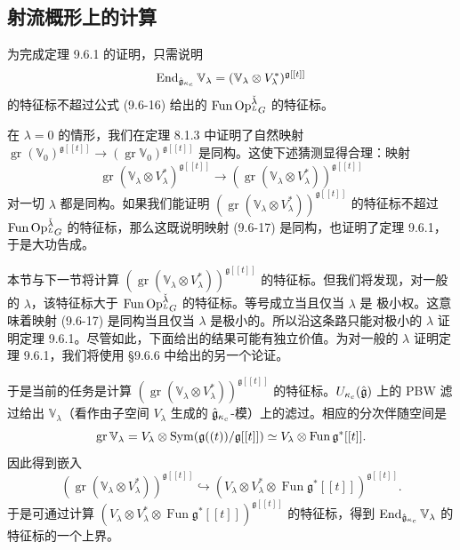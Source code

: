 \subsection{射流概形上的计算}

为完成定理 9.6.1 的证明，只需说明
\[
    \operatorname{End}_{\hat{\mathfrak{g}}_{\kappa_c}}\mathbb{V}_\lambda
    =(\mathbb{V}_\lambda\otimes V_\lambda^*)^{\mathfrak{g}[[t]]}
\]
的特征标不超过公式 (9.6-16) 给出的 $\operatorname{Fun}\operatorname{Op}^{\check\lambda}_{{}^LG}$ 的特征标。

在 $\lambda=0$ 的情形，我们在定理 8.1.3 中证明了自然映射
$\operatorname{gr}(\mathbb{V}_0)^{\mathfrak{g}[[t]]}\to(\operatorname{gr}\mathbb{V}_0)^{\mathfrak{g}[[t]]}$ 是同构。这使下述猜测显得合理：映射
\begin{equation}
    \operatorname{gr}(\mathbb{V}_\lambda\otimes V_\lambda^*)^{\mathfrak{g}[[t]]}
    \to\left(\operatorname{gr}(\mathbb{V}_\lambda\otimes V_\lambda^*)\right)^{\mathfrak{g}[[t]]}
    \tag{9.6-17}
\end{equation}
对一切 $\lambda$ 都是同构。如果我们能证明 $\left(\operatorname{gr}(\mathbb{V}_\lambda\otimes V_\lambda^*)\right)^{\mathfrak{g}[[t]]}$ 的特征标不超过 $\operatorname{Fun}\operatorname{Op}^{\check\lambda}_{{}^LG}$ 的特征标，那么这既说明映射 (9.6-17) 是同构，也证明了定理 9.6.1，于是大功告成。

本节与下一节将计算 $\left(\operatorname{gr}(\mathbb{V}_\lambda\otimes V_\lambda^*)\right)^{\mathfrak{g}[[t]]}$ 的特征标。但我们将发现，对一般的 $\lambda$，该特征标大于 $\operatorname{Fun}\operatorname{Op}^{\check\lambda}_{{}^LG}$ 的特征标。等号成立当且仅当 $\lambda$ 是 极小权。这意味着映射 (9.6-17) 是同构当且仅当 $\lambda$ 是极小的。所以沿这条路只能对极小的 $\lambda$ 证明定理 9.6.1。尽管如此，下面给出的结果可能有独立价值。为对一般的 $\lambda$ 证明定理 9.6.1，我们将使用 §9.6.6 中给出的另一个论证。

于是当前的任务是计算 $\left(\operatorname{gr}(\mathbb{V}_\lambda\otimes V_\lambda^*)\right)^{\mathfrak{g}[[t]]}$ 的特征标。$U_{\kappa_c}(\hat{\mathfrak{g}})$ 上的 PBW 滤过给出 $\mathbb{V}_\lambda$（看作由子空间 $V_\lambda$ 生成的 $\hat{\mathfrak{g}}_{\kappa_c}$-模）上的滤过。相应的分次伴随空间是
\[
    \operatorname{gr}\mathbb{V}_\lambda
    =V_\lambda\otimes\operatorname{Sym}(\mathfrak{g}((t))/\mathfrak{g}[[t]])
    \simeq V_\lambda\otimes\operatorname{Fun}\mathfrak{g}^*[[t]].
\]
因此得到嵌入
\[
    \left(\operatorname{gr}(\mathbb{V}_\lambda\otimes V_\lambda^*)\right)^{\mathfrak{g}[[t]]}
    \hookrightarrow\left(V_\lambda\otimes V_\lambda^*\otimes\operatorname{Fun}\mathfrak{g}^*[[t]]\right)^{\mathfrak{g}[[t]]}.
\]
于是可通过计算 $\left(V_\lambda\otimes V_\lambda^*\otimes\operatorname{Fun}\mathfrak{g}^*[[t]]\right)^{\mathfrak{g}[[t]]}$ 的特征标，得到 $\operatorname{End}_{\hat{\mathfrak{g}}_{\kappa_c}}\mathbb{V}_\lambda$ 的特征标的一个上界。


